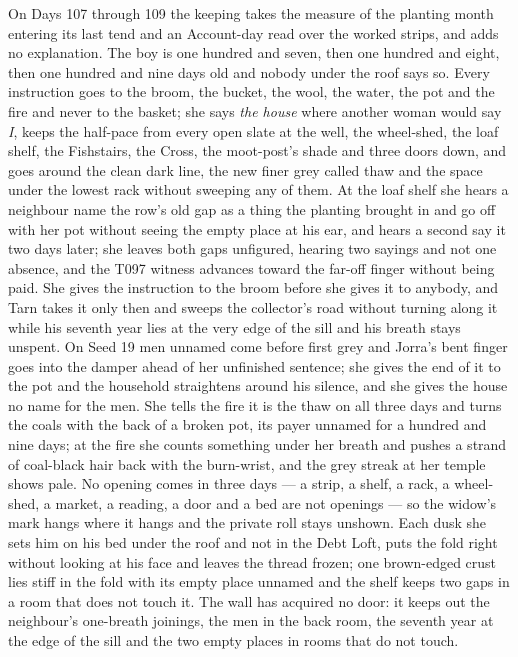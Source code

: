\documentclass{design/chronicle}
\begin{document}
{On Days 107 through 109 the keeping takes the measure of the planting month entering its last tend and an Account-day read over the worked strips, and adds no explanation. The boy is one hundred and seven, then one hundred and eight, then one hundred and nine days old and nobody under the roof says so. Every instruction goes to the broom, the bucket, the wool, the water, the pot and the fire and never to the basket; she says \emph{the house} where another woman would say \emph{I}, keeps the half-pace from every open slate at the well, the wheel-shed, the loaf shelf, the Fishstairs, the Cross, the moot-post’s shade and three doors down, and goes around the clean dark line, the new finer grey called thaw and the space under the lowest rack without sweeping any of them. At the loaf shelf she hears a neighbour name the row’s old gap as a thing the planting brought in and go off with her pot without seeing the empty place at his ear, and hears a second say it two days later; she leaves both gaps unfigured, hearing two sayings and not one absence, and the T097 witness advances toward the far-off finger without being paid. She gives the instruction to the broom before she gives it to anybody, and Tarn takes it only then and sweeps the collector’s road without turning along it while his seventh year lies at the very edge of the sill and his breath stays unspent. On Seed 19 men unnamed come before first grey and Jorra’s bent finger goes into the damper ahead of her unfinished sentence; she gives the end of it to the pot and the household straightens around his silence, and she gives the house no name for the men. She tells the fire it is the thaw on all three days and turns the coals with the back of a broken pot, its payer unnamed for a hundred and nine days; at the fire she counts something under her breath and pushes a strand of coal-black hair back with the burn-wrist, and the grey streak at her temple shows pale. No opening comes in three days — a strip, a shelf, a rack, a wheel-shed, a market, a reading, a door and a bed are not openings — so the widow’s mark hangs where it hangs and the private roll stays unshown. Each dusk she sets him on his bed under the roof and not in the Debt Loft, puts the fold right without looking at his face and leaves the thread frozen; one brown-edged crust lies stiff in the fold with its empty place unnamed and the shelf keeps two gaps in a room that does not touch it. The wall has acquired no door: it keeps out the neighbour’s one-breath joinings, the men in the back room, the seventh year at the edge of the sill and the two empty places in rooms that do not touch.

}
\end{document}
